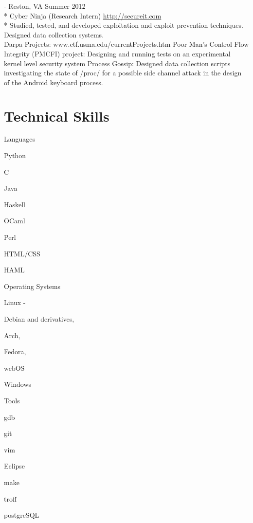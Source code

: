 \documentclass[letter,margin,line]{resume}
\newcommand{\rurl}[1]{\hfill {\footnotesize \url{#1}}}
\newcommand{\rdate}[1]{\hfill {\small #1}}
\renewcommand{\employer}[5]{\item[#1] - #2 \rdate{#3} \\* #4 \rurl{#5} \\*}
\begin{document}
\begin{resume}
\begin{asparadesc}
		\employer{SecureIT}{Reston, VA}{Summer 2012}{Cyber Ninja (Research Intern)}{http://secureit.com}
		Studied, tested, and developed exploitation and exploit prevention techniques. Designed data collection systems.
		\\
        Darpa Projects: \hfill www.ctf.usma.edu/currentProjects.htm
		Poor Man’s Control Flow Integrity (PMCFI) project: Designing and running tests on an experimental kernel level security system
		Process Gossip: Designed data collection scripts investigating the state of /proc/ for a possible side channel attack in the design of the Android keyboard process.
	\end{asparadesc}

\section{\mysidestyle Technical Skills}
	\begin{compactdesc}
		\item[Languages] \begin{inparaenum} { \small
			\item Python
			\item C
			\item Java
			\item Haskell
            \item OCaml
            \item Perl
            \item HTML/CSS
			\item HAML
		} \end{inparaenum}
		\item[Operating Systems] \begin{inparaenum} { \small
			\item Linux -
			\begin{inparablank}
				\item Debian and derivatives,
				\item Arch,
				\item Fedora,
				\item webOS
			\end{inparablank}
			\item Windows
		} \end{inparaenum}
		\item[Tools] \begin{inparaenum} { \small
			\item gdb
			\item git
			\item vim
			\item Eclipse
			\item make
			\item troff
			\item postgreSQL
		} \end{inparaenum}
	\end{compactdesc}

\end{resume}
\end{document}
